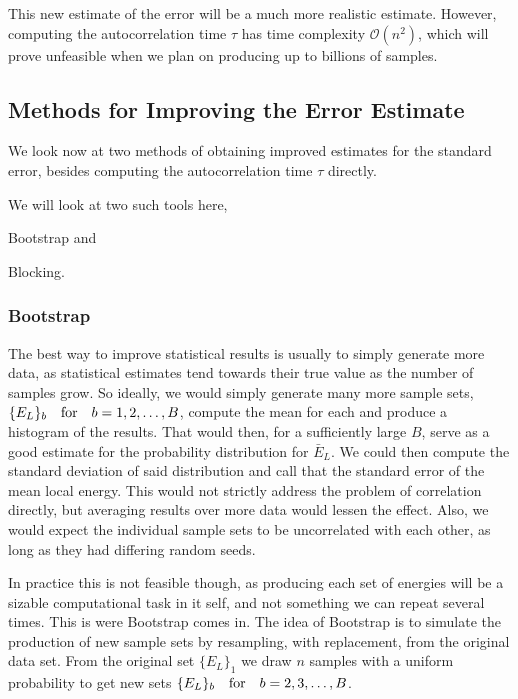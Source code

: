\documentclass[twocolumn]{article}
\begin{document}
This new estimate of the error will be a much more realistic estimate. However,
computing the autocorrelation time $\tau$ has time complexity $\mathcal{O}(n^2)$, which will prove
unfeasible when we plan on producing up to billions of samples.

\subsection{Methods for Improving the Error Estimate}

We look now at two methods of obtaining improved estimates for the standard
error, besides computing the autocorrelation time $\tau$ directly.

We will look at two such tools here, 
\begin{inparaenum}[1)]
    \item Bootstrap and
    \item Blocking.
\end{inparaenum}

\subsubsection{Bootstrap}
The best way to improve statistical results is usually to simply generate more
data, as statistical estimates tend towards their true value as the number of
samples grow. So ideally, we would simply generate many more sample sets,
$\{E_L\}_b \qfor b=1, 2, \dots, B$, compute the mean for each and produce a
histogram of the results. That would then, for a sufficiently large $B$, serve as
a good estimate for the probability distribution for $\bar E_L$. We could then
compute the standard deviation of said distribution and call that the standard
error of the mean local energy. This would not strictly address the problem of
correlation directly, but averaging results over more data would lessen the
effect. Also, we would expect the individual sample sets to be uncorrelated with
each other, as long as they had differing random seeds.

In practice this is not feasible though, as producing each set of energies will be a
sizable computational task in it self, and not something we can repeat several
times. This is were Bootstrap comes in. The idea of Bootstrap is to simulate
the production of new sample sets by resampling, with replacement, from the
original data set. From the original set $\{E_L\}_1$ we draw $n$ samples with a
uniform probability to get new sets $\{E_L\}_b\qfor b = 2,3,\dots,B$.
\end{document}
